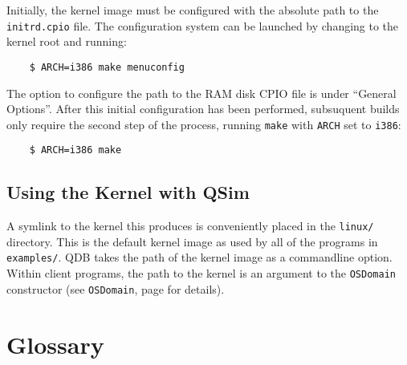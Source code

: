 \documentclass[letterpaper, 10pt]{book}
\begin{document}
Initially, the kernel image must be configured with the absolute path to the
\texttt{initrd.cpio} file. The configuration system can be launched by changing
to the kernel root and running:

\begin{verbatim}
    $ ARCH=i386 make menuconfig
\end{verbatim}

The option to configure the path to the RAM disk CPIO file is under ``General
Options''. After this initial configuration has been performed, subsuquent
builds only require the second step of the process, running \texttt{make} with
\texttt{ARCH} set to \texttt{i386}:

\begin{verbatim}
    $ ARCH=i386 make
\end{verbatim}

\section{Using the Kernel with QSim}
A symlink to the kernel this produces is conveniently placed in the
\texttt{linux/} directory. This is the default kernel image as used by all of
the programs in \texttt{examples/}. QDB takes the path of the kernel image as a
commandline option. Within client programs, the path to the kernel is an
argument to the \texttt{OSDomain} constructor (see \texttt{OSDomain}, page 
\pageref{class:OSDomain} for details).

\chapter*{Glossary}
\end{document}
